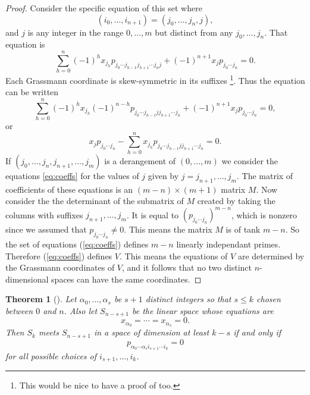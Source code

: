 \documentclass[a4paper,12pt]{book}
\theoremstyle{plain}
\newtheorem{thm}[equation]{Theorem}
\theoremstyle{definition}
\begin{document}
\begin{proof}
	Consider the specific equation of this set where
	\[
		(i_0, \ldots, i_{n+1}) = (j_0, \ldots, j_n, j),
	\]
	and \( j \) is any integer in the range \( 0, \ldots, m \) but
	distinct from any \( j_0, \ldots, j_n \).
	That equation is
	\[
		\sum_{h = 0}^{n} (-1)^h x_{j_h}
		p_{j_0 \cdots j_{h-1} j_{h+1} \cdots j_{n} j}
		+ (-1)^{n+1} x_j p_{j_0 \cdots j_{n}} = 0 .
	\]
	Each Grassmann coordinate is skew-symmetric in its suffixes
	\footnote{This would be nice to have a proof of too.}.
	Thus the equation can be written
	\[
		\sum_{h = 0}^{n} (-1)^h x_{j_h} (-1)^{n-h}
		p_{j_0 \cdots j_{h-1} j j_{h+1} \cdots j_{n}}
		+ (-1)^{n+1} x_j p_{j_0 \cdots j_{n}} = 0 ,
	\]
	or
	\begin{equation}
	\label{eq:coeffs}
		x_j p_{j_0 \cdots j_{n}} -
		\sum_{h = 0}^{n} x_{j_h}
		p_{j_0 \cdots j_{h-1} j j_{h+1} \cdots j_{n}} = 0 .
	\end{equation}
	If \( (j_0, \ldots, j_n, j_{n+1}, \ldots, j_m) \) is a derangement
	of \( (0, \ldots, m) \) we consider the equations \ref{eq:coeffs}
	for the values of \( j \) given by \( j = j_{n+1}, \ldots, j_m \).
	The matrix of coefficients of these equations is an
	\( (m-n) \times (m+1) \) matrix \( M \).
	Now consider the the determinant of the submatrix of \( M \) created by
	taking the columns with suffixes \( j_{n+1}, \ldots, j_m \). It is equal to
	\( (p_{j_0 \cdots j_n})^{m-n} \), which is nonzero since we assumed that
	\( p_{j_0 \cdots j_n} \not = 0 \). This means the matrix \( M \) is of
	tank \( m-n \).
	So the set of equations (\ref{eq:coeffs}) defines \( m-n \) linearly
	independant primes. Therefore (\ref{eq:coeffs}) defines \( V \).
	This means the equations of \( V \) are determined by the Grassmann
	coordinates of \( V \), and it follows that no two distinct
	\( n \)-dimensional spaces can have the same coordinates.
\end{proof}

\begin{thm}[\cite{MR0028055}]
	Let \( \alpha_0, \ldots, \alpha_s \) be \( s+1 \) distinct integers so that
	\( s \leq k \) chosen between \( 0 \) and \( n \). Also let \( S_{n-s+1} \) be the linear
	space whose equations are
	\[
		x_{\alpha_0} = \cdots = x_{\alpha_s} = 0.
	\]
	Then \( S_k \) meets \( S_{n-s+1} \) in a space of dimension at least \( k-s \) if and only if
	\[
		p_{\alpha_0 \cdots \alpha_s i_{s+1} \cdots i_k} = 0
	\]
	for all possible choices of \( i_{s+1}, \ldots, i_k \).
\end{thm}
\end{document}
